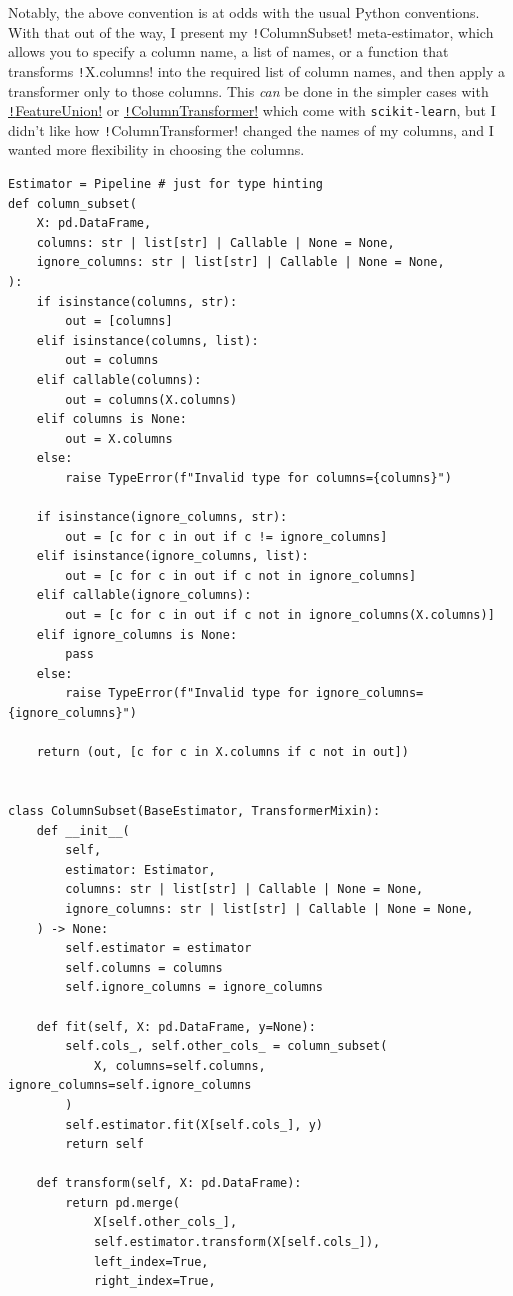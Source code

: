 \documentclass[11pt]{article}
\theoremstyle{definition}
\begin{document}
Notably, the above convention is at odds with the usual Python conventions. With that out of the way, I present my \texttt!ColumnSubset! meta-estimator, which allows you to specify a column name, a list of names, or a function that transforms \texttt!X.columns! into the required list of column names, and then apply a transformer only to those columns. This \emph{can} be done in the simpler cases with \href{https://scikit-learn.org/stable/modules/generated/sklearn.pipeline.FeatureUnion.html}{\texttt!FeatureUnion!} or \href{https://scikit-learn.org/stable/modules/generated/sklearn.compose.ColumnTransformer.html\#sklearn-compose-columntransformer}{\texttt!ColumnTransformer!} which come with \texttt{scikit-learn}, but I didn't like how \texttt!ColumnTransformer! changed the names of my columns, and I wanted more flexibility in choosing the columns.
\begin{verbatim}
Estimator = Pipeline # just for type hinting
def column_subset(
    X: pd.DataFrame,
    columns: str | list[str] | Callable | None = None,
    ignore_columns: str | list[str] | Callable | None = None,
):
    if isinstance(columns, str):
        out = [columns]
    elif isinstance(columns, list):
        out = columns
    elif callable(columns):
        out = columns(X.columns)
    elif columns is None:
        out = X.columns
    else:
        raise TypeError(f"Invalid type for columns={columns}")

    if isinstance(ignore_columns, str):
        out = [c for c in out if c != ignore_columns]
    elif isinstance(ignore_columns, list):
        out = [c for c in out if c not in ignore_columns]
    elif callable(ignore_columns):
        out = [c for c in out if c not in ignore_columns(X.columns)]
    elif ignore_columns is None:
        pass
    else:
        raise TypeError(f"Invalid type for ignore_columns={ignore_columns}")

    return (out, [c for c in X.columns if c not in out])


class ColumnSubset(BaseEstimator, TransformerMixin):
    def __init__(
        self,
        estimator: Estimator,
        columns: str | list[str] | Callable | None = None,
        ignore_columns: str | list[str] | Callable | None = None,
    ) -> None:
        self.estimator = estimator
        self.columns = columns
        self.ignore_columns = ignore_columns

    def fit(self, X: pd.DataFrame, y=None):
        self.cols_, self.other_cols_ = column_subset(
            X, columns=self.columns, ignore_columns=self.ignore_columns
        )
        self.estimator.fit(X[self.cols_], y)
        return self

    def transform(self, X: pd.DataFrame):
        return pd.merge(
            X[self.other_cols_],
            self.estimator.transform(X[self.cols_]),
            left_index=True,
            right_index=True,
\end{verbatim}
\end{document}
